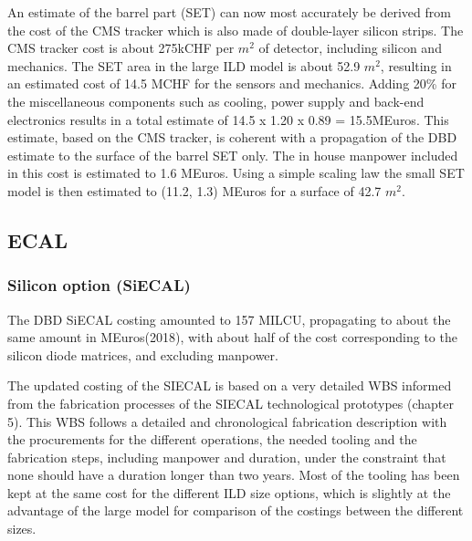 
An estimate of the barrel part (SET) can now most accurately be derived from the cost of the CMS tracker which is also made of double-layer silicon strips. The CMS tracker cost is about 275kCHF per $m^2$ of detector, including silicon and mechanics. The SET area in the large ILD model is about 52.9 $m^2$, resulting in an estimated cost of 14.5 MCHF for the sensors and mechanics. Adding 20\% for the miscellaneous components such as cooling, power supply and back-end electronics results in a total estimate of 14.5 x 1.20 x 0.89 = 15.5MEuros. This estimate, based on the CMS tracker, is coherent with a propagation of the DBD estimate to the surface of the barrel SET only. The in house manpower included in this cost is estimated to 1.6 MEuros.
Using a simple scaling law the small SET model is then estimated to (11.2, 1.3) MEuros for a surface of 42.7 $m^2$. 



\subsection{ECAL}
\subsubsection{Silicon option (SiECAL)}
The DBD SiECAL costing amounted to 157 MILCU, propagating to about the same amount in MEuros(2018), with about half of the cost corresponding to the silicon diode matrices, and excluding manpower.

The updated costing of the SIECAL is based on a very detailed WBS informed from the fabrication processes of the SIECAL technological prototypes (chapter 5). This WBS follows a detailed and chronological fabrication description with the procurements for the different operations, the needed tooling and the fabrication steps, including manpower and duration, under the constraint that none should have a duration longer than two years. Most of the tooling has been kept at the same cost for the different ILD size options, which is slightly at the advantage of the large model for comparison of the costings between the different sizes.

